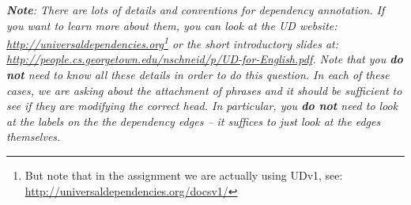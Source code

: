 \begin{parts}
\textit{\textbf{Note}: 
There are lots of details and conventions for dependency annotation. 
If you want to learn more about them, you can look at the UD website: \url{http://universaldependencies.org}\footnote{But note that in the assignment we are actually using UDv1, see: \url{http://universaldependencies.org/docsv1/}} or the short introductory slides at: \url{http://people.cs.georgetown.edu/nschneid/p/UD-for-English.pdf}.
Note that you \textbf{do not} need to know all these details in order to do this question. In each of these cases, we are asking about the attachment of phrases and it should be sufficient to see if they are modifying the correct head.
In particular, you \textbf{do not} need to look at the labels on the the dependency edges -- it suffices to just look at the edges themselves. }

\medskip



\end{parts}
